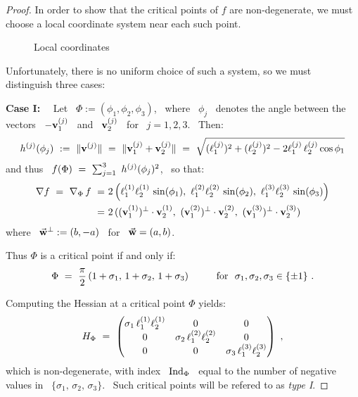 \begin{proof}
%
In order to show that the critical points of $f$ are non-degenerate,
we must choose a local coordinate system near each such point.

\begin{figure}[htbp]
\begin{center}
\epsfysize=6cm %
\leavevmode {} \caption{Local
coordinates} \label{floccoord}
\end{center}
\end{figure}


Unfortunately, there is no uniform choice of such a system, so we must
distinguish three cases\vsm:

\noindent\textbf{Case I:} \ \
Let \ $\Phi:=(\phi_{1},\phi_{2},\phi_{3})$, \ where \
$\phi_{j}$ \ denotes the angle between the vectors \ $-\mathbf{v}\sp{({j})}_{1}$ \
and \ $\mathbf{v}\sp{({j})}_{2}$ \ for \ $j=1,2,3$. \ Then:
%
\begin{equation}\label{eqh}
%
\hj{j}(\phi_{j})~:=~\|\vj{j}\|~=~\|\vj{j}_{1}+\vj{j}_{2}\|~=~
\sqrt{(\lj{j}_{1})^{2}+(\lj{j}_{2})^{2}-2\lj{j}_{1}\,\lj{j}_{2}\cos\phi_{1}}
%
\end{equation}
%
and thus \ $f(\Phi)~=~\sum_{j=1}^{3}\ h\sp{({j})}(\phi_{j})^{2}$, \ so that:
%
\begin{equation}\label{eqnabla}
%
\begin{split}
%
\nabla f~=~\nabla_{\Phi}\,f~=&~2\left(\lj{1}_{1}\lj{1}_{2}\,\sin(\phi_{1}),\
\lj{2}_{1}\lj{2}_{2}\,\sin(\phi_{2}),\
\lj{3}_{1}\lj{3}_{2}\,\sin(\phi_{3})\right)\\
=&~2\,(\vpp{1},~\vpp{2},~\vpp{3})
%
\end{split}
%
\end{equation}
%
where \ $\vec{\mathbf{w}}^{\perp}:=(b,-a)$ \ for \ $\vec{\mathbf{w}}=(a,b)$.

Thus $\Phi$ is a critical point if and only if:
%
\begin{equation}\label{eqsigma}
%
\Phi~=~\frac{\pi}{2}\,(1+\sigma_{1},\,1+\sigma_{2},\,1+\sigma_{3})
\hspace*{10mm}\text{for \ } \sigma_{1},\sigma_{2},\sigma_{3}\in\{\pm 1\}~.
%
\end{equation}

Computing the Hessian at a critical point $\Phi$ yields:
$$
H_{\Phi}~=~\begin{pmatrix}
        \sigma_{1}\,\ell\sp{({1})}_{1}\ell\sp{({1})}_{2} & 0  & 0 \\
0 &     \sigma_{2}\,\ell\sp{({2})}_{1}\ell\sp{({2})}_{2} & 0  \\
0 & 0 & \sigma_{3}\,\ell\sp{({3})}_{1}\ell\sp{({3})}_{2}
\end{pmatrix}~,
$$
%
which is non-degenerate, with index \ $\operatorname{Ind}_{\Phi}$ \ equal to the
number of negative values in \
$\{\sigma_{1},\,\sigma_{2},\,\sigma_{3}\}$. \ Such critical points
will be refered to as \emph{type I}.


\end{proof}
